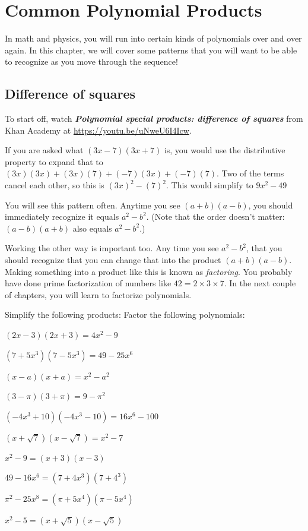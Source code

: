 \chapter{Common Polynomial Products}

In math and physics, you will run into certain kinds of polynomials
over and over again. In this chapter, we will cover some
patterns that you will want to be able to recognize as you move through the sequence!

\section{Difference of squares}

To start off, watch \textbf{\textit{Polynomial special products: difference of squares}} from Khan Academy at \url{https://youtu.be/uNweU6I4Icw}.

If you are asked what $(3x - 7)(3x + 7)$ is, you would use the
distributive property to expand that to $(3x)(3x) + (3x)(7) + (-7)(3x) + (-7)(7)$.
Two of the terms cancel each other, so this is $(3x)^2 - (7)^2$. This would simplify to $9x^2 - 49$

You will see this pattern often. Anytime you see $(a + b)(a - b)$, you should immediately
recognize it equals $a^2 - b^2$. (Note that the order doesn't matter: $(a - b)(a + b)$ also equals $a^2 - b^2$.)

Working the other way is important too. Any time you see $a^2 - b^2$,
that you should recognize that you can change that into the product
$(a + b)(a - b)$. Making something into a product like this is known as
\emph{factoring}. You probably have done prime factorization of
numbers like $42 = 2 \times 3 \times 7$. In the next couple of
chapters, you will learn to factorize polynomials.

\begin{Exercise}[title={Difference of Squares}, label=diffsquares]
  Simplify the following products:
  Factor the following polynomials:
\end{Exercise}
\begin{Answer}[ref=diffsquares]
  $(2x - 3)(2x + 3) = 4x^2 - 9$
  
  $(7 + 5x^3)(7 - 5x^3) = 49 - 25x^6$
  
  $(x - a)(x + a) = x^2 - a^2$
  
  $(3 - \pi)(3 + \pi) = 9 - \pi^2$
  
  $(-4x^3 + 10)(-4x^3 - 10) = 16x^6 - 100$
  
  $(x + \sqrt{7})(x - \sqrt{7}) = x^2 - 7$

  $x^2 - 9 = (x + 3)(x - 3)$

  $49 - 16x^6 = (7 + 4x^3)(7 + 4^3)$
  
  $\pi^2 - 25x^8 = (\pi + 5x^4)(\pi - 5x^4)$
  
  $x^2 - 5 = (x + \sqrt{5})(x - \sqrt{5})$

\end{Answer}

